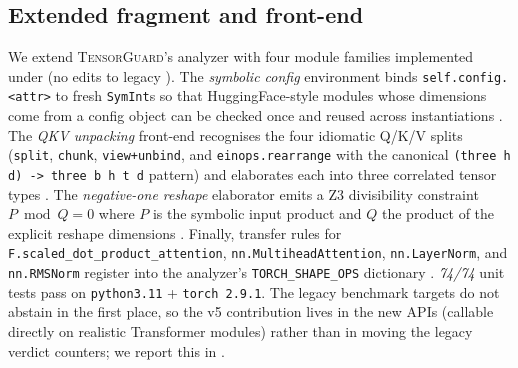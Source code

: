 \subsection{Extended fragment and front-end}\label{sec:impl-fragment}
We extend \textsc{TensorGuard}'s analyzer with four module families
implemented under (no edits to legacy
). The \emph{symbolic config} environment binds
\texttt{self.config.<attr>} to fresh \texttt{SymInt}s so that
HuggingFace-style modules whose dimensions come from a config object
can be checked once and reused across instantiations
. The \emph{QKV unpacking}
front-end recognises the four idiomatic Q/K/V splits
(\texttt{split}, \texttt{chunk}, \texttt{view+unbind}, and
\texttt{einops.rearrange} with the canonical
\verb|(three h d) -> three b h t d| pattern) and elaborates each
into three correlated tensor types
. The \emph{negative-one
reshape} elaborator emits a Z3 divisibility constraint
$P \bmod Q = 0$ where $P$ is the symbolic input product and $Q$ the
product of the explicit reshape dimensions
. Finally, transfer rules for
\texttt{F.scaled\_dot\_product\_attention},
\texttt{nn.MultiheadAttention}, \texttt{nn.LayerNorm}, and
\texttt{nn.RMSNorm} register into the analyzer's
\texttt{TORCH\_SHAPE\_OPS} dictionary
. \emph{74/74}
unit tests pass on \texttt{python3.11} +
\texttt{torch~2.9.1}.
The legacy benchmark targets do not abstain in the first place,
so the v5 contribution lives in the new APIs (callable directly on
realistic Transformer modules) rather than in moving the legacy
verdict counters; we report this in
.

